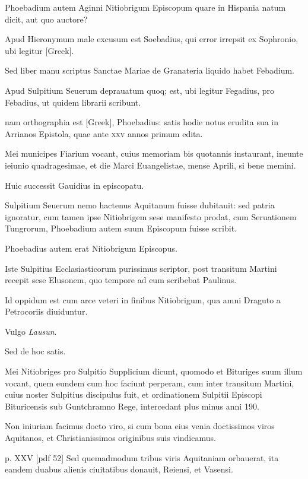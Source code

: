 \begin{parnumbers}
Phoebadium autem Aginni Nitiobrigum
Episcopum quare in Hispania natum dicit, aut quo auctore?

Apud Hieronymum male excusum est Soebadius, qui error irrepsit
ex Sophronio, ubi legitur \textgreek{[Greek]}.

Sed liber manu scriptus
Sanctae Mariae de Granateria liquido habet Febadium.

Apud Sulpitium
Seuerum deprauatum quoq; est, ubi legitur Fegadius, pro
Febadius, ut quidem librarii scribunt.

nam orthographia est \textgreek{[Greek]},
Phoebadius: satis hodie notus erudita sua in Arrianos Epistola,
quae ante \textsc{xxv} annos primum edita.

Mei municipes Fiarium vocant,
cuius memoriam bis quotannis instaurant, ineunte ieiunio
quadragesimae, et die Marci Euangelistae, mense Aprili, si bene
memini.

Huic successit Gauidius in episcopatu.

Sulpitium Seuerum
nemo hactenus Aquitanum fuisse dubitauit: sed patria ignoratur,
cum tamen ipse Nitiobrigem sese manifesto prodat, cum Seruationem
Tungrorum, Phoebadium autem suum Episcopum fuisse scribit.

Phoebadius autem erat Nitiobrigum Episcopus.

Iste Sulpitius
Ecclasiasticorum purissimus scriptor, post transitum Martini recepit
sese Elusonem, quo tempore ad eum scribebat Paulinus.

Id oppidum est cum arce veteri in finibus Nitiobrigum, qua amni Draguto
a Petrocoriis diuiduntur.

Vulgo \textit{Lausun}.

Sed de hoc satis.

Mei
Nitiobriges pro Sulpitio Supplicium dicunt, quomodo et Bituriges
suum illum vocant, quem eundem cum hoc faciunt perperam,
cum inter transitum Martini, cuius noster Sulpitius discipulus fuit,
et ordinationem Sulpitii Episcopi Bituricensis sub Guntchramno
Rege, intercedant plus minus anni 190.

Non iniuriam facimus
docto viro, si cum bona eius venia doctissimos viros Aquitanos,
et Christianissimos originibus suis vindicamus.

\clearpage
p. XXV [pdf 52]
Sed quemadmodum tribus viris Aquitaniam orbauerat, ita eandem duabus
alienis ciuitatibus donauit, Reiensi, et Vasensi.


\end{parnumbers}
